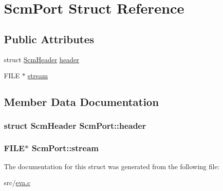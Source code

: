 \hypertarget{struct_scm_port}{\section{Scm\-Port Struct Reference}
\label{struct_scm_port}
}
\subsection*{Public Attributes}
\begin{DoxyCompactItemize}
\item 
struct \hyperlink{struct_scm_header}{Scm\-Header} \hyperlink{struct_scm_port_ac411b70fa0b67f2b3dd332d5a1c59165}{header}
\item 
F\-I\-L\-E $\ast$ \hyperlink{struct_scm_port_aa1971b2c7e812b37c7b5cffbbaa0ff2e}{stream}
\end{DoxyCompactItemize}


\subsection{Member Data Documentation}
\hypertarget{struct_scm_port_ac411b70fa0b67f2b3dd332d5a1c59165}{
\subsubsection[{header}]{\setlength{\rightskip}{0pt plus 5cm}struct {\bf Scm\-Header} Scm\-Port\-::header}}\label{struct_scm_port_ac411b70fa0b67f2b3dd332d5a1c59165}
\hypertarget{struct_scm_port_aa1971b2c7e812b37c7b5cffbbaa0ff2e}{
\subsubsection[{stream}]{\setlength{\rightskip}{0pt plus 5cm}F\-I\-L\-E$\ast$ Scm\-Port\-::stream}}\label{struct_scm_port_aa1971b2c7e812b37c7b5cffbbaa0ff2e}


The documentation for this struct was generated from the following file\-:\begin{DoxyCompactItemize}
\item 
src/\hyperlink{eva_8c}{eva.\-c}\end{DoxyCompactItemize}
